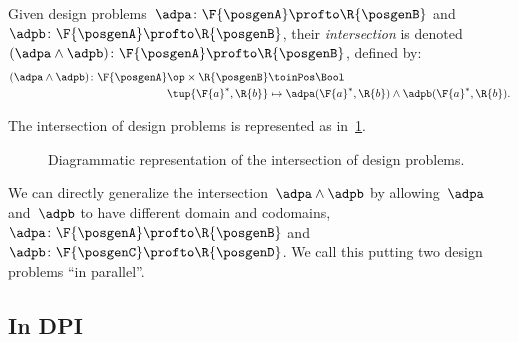 \begin{definition}
    \label{def:intersection_dp}
    \label{def:dp-intersection}
    Given design problems~$\adpa\colon \F{\posgenA} \profto \R{\posgenB}$ and~$\adpb\colon \F{\posgenA} \profto \R{\posgenB}$,
    their \emph{intersection} is denoted~$(\adpa \wedge \adpb)\colon \F{\posgenA} \profto \R{\posgenB}$, defined by:
    \begin{equation}
        \begin{aligned}
        (\adpa \wedge \adpb)
            \colon \F{\posgenA}\op \times \R{\posgenB} & \toinPos \Bool \\
            \tup{\F{a}^*, \R{b}} & \mapsto \adpa(\F{a}^*, \R{b}) \wedge  \adpb(\F{a}^*, \R{b}).
        \end{aligned}
    \end{equation}
\end{definition}
The intersection of design problems is represented as in~\cref{fig:intersectiondp}.

\begin{figure}[h!]
    \begin{center}
    \end{center}
    \caption{Diagrammatic representation of the intersection of design problems. }
    \label{fig:intersectiondp}
\end{figure}

We can directly generalize the intersection~$\adpa \wedge \adpb$ by allowing~$\adpa$ and~$\adpb$ to have different domain and codomains,~$\adpa \colon \F{\posgenA} \profto \R{\posgenB}$ and~$\adpb \colon \F{\posgenC} \profto \R{\posgenD}$.
We call this putting two design problems ``in parallel''.

\subsection{In DPI}\label{subsec:dpi-intersection}

